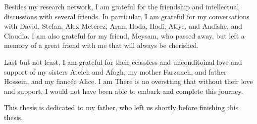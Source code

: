 Besides my research network, I am grateful for the friendship and intellectual discussions with several friends. In particular, I am grateful for my conversations with David, Stefan, Alex Meterez, Aran, Hoda, Hadi, Atiye, and Andishe, and Claudia. I am also grateful for my friend, Meysam, who passed away, but left a memory of a great friend with me that will always be cherished.

Last but not least, I am grateful for their ceassless and unconditoinal love and support of my sisters Atefeh and Afagh, my mother Farzaneh, and father Hossein, and my fiancée Alice. I am  There is no overstting that without their love and support, I would not have been able to embark and complete this journey.

\newpage

This thesis is dedicated to my father, who left us shortly before finishing this thesis.